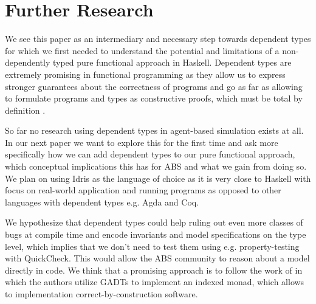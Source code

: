 \section{Further Research}
\label{sec:further_research}
We see this paper as an intermediary and necessary step towards dependent types for which we first needed to understand the potential and limitations of a non-dependently typed pure functional approach in Haskell. Dependent types are extremely promising in functional programming as they allow us to express stronger guarantees about the correctness of programs and go as far as allowing to formulate programs and types as constructive proofs, which must be total by definition \cite{thompson_type_1991, mckinna_why_2006, altenkirch_pi_2010}.

So far no research using dependent types in agent-based simulation exists at all. In our next paper we want to explore this for the first time and ask more specifically how we can add dependent types to our pure functional approach, which conceptual implications this has for ABS and what we gain from doing so. We plan on using Idris \cite{brady_idris_2013} as the language of choice as it is very close to Haskell with focus on real-world application and running programs as opposed to other languages with dependent types e.g. Agda and Coq.

We hypothesize that dependent types could help ruling out even more classes of bugs at compile time and encode invariants and model specifications on the type level, which implies that we don't need to test them using e.g. property-testing with QuickCheck. This would allow the ABS community to reason about a model directly in code. We think that a promising approach is to follow the work of \cite{brady_programming_2013, fowler_dependent_2014, brady_state_2016} in which the authors utilize GADTs to implement an indexed monad, which allows to implementation correct-by-construction software.

